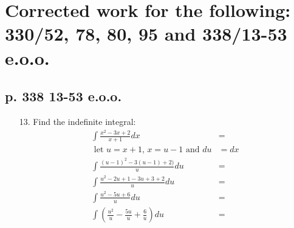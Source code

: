 \documentclass[11pt]{article}
\begin{document}
\section{Corrected work for the following: 330/52, 78, 80, 95 and 338/13-53 e.o.o.}
\subsection{p. 338 13-53 e.o.o.}
\begin{enumerate}
	\item[13. ] Find the indefinite integral:
		\begin{align}
			\int \frac{x^2-3x+2}{x+1}dx&= \\
			\text{ let } u = x+1\text{, } x = u-1\text{ and } du&=dx\\
			\int \frac{(u-1)^2-3(u-1)+2)}{u}du &=\\
			\int \frac{u^2-2u+1-3u+3+2}{u}du &=\\
			\int \frac{u^2-5u+6}{u}du &= \\
			\int \left( \frac{u^2}{u}-\frac{5u}{u}+\frac{6}{u}\right)du&=\\
		\end{align}
\end{enumerate}
\end{document}

